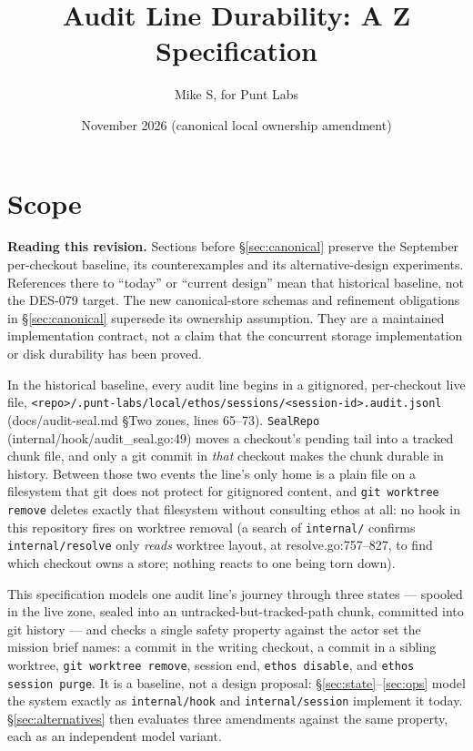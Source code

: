 \documentclass[a4paper,10pt,fleqn]{article}
\newcommand{\fpath}[1]{\nolinkurl{#1}}
\newcommand{\field}[1]{\ifmmode\texttt{#1}\else\texorpdfstring{\breakfield{#1}}{#1}\fi}
\begin{document}
\title{Audit Line Durability: A Z Specification}
\author{Mike S, for Punt Labs}
\date{November 2026 (canonical local ownership amendment)}
\maketitle
\tableofcontents
\newpage

\section{Scope}
\label{sec:scope}

\textbf{Reading this revision.} Sections before
\S\ref{sec:canonical} preserve the September per-checkout baseline,
its counterexamples and its alternative-design experiments. References
there to ``today'' or ``current design'' mean that historical baseline,
not the DES-079 target. The new canonical-store schemas and refinement
obligations in \S\ref{sec:canonical} supersede its ownership assumption.
They are a maintained implementation contract, not a claim that the
concurrent storage implementation or disk durability has been proved.

In the historical baseline, every audit line begins in a gitignored, per-checkout
live file, \fpath{<repo>/.punt-labs/local/ethos/sessions/<session-id>.audit.jsonl}
(docs/audit-seal.md \S Two zones, lines 65--73). \field{SealRepo}
(internal/hook/audit\_seal.go:49) moves a checkout's pending tail into a
tracked chunk file, and only a git commit in \emph{that} checkout makes the
chunk durable in history. Between those two events the line's only home is a
plain file on a filesystem that git does not protect for gitignored content,
and \fpath{git worktree remove} deletes exactly that filesystem without
consulting ethos at all: no hook in this repository fires on worktree
removal (a search of \fpath{internal/} confirms \fpath{internal/resolve}
only \emph{reads} worktree layout, at resolve.go:757--827, to find which
checkout owns a store; nothing reacts to one being torn down).

This specification models one audit line's journey through three states
--- spooled in the live zone, sealed into an untracked-but-tracked-path
chunk, committed into git history --- and checks a single safety property
against the actor set the mission brief names: a commit in the writing
checkout, a commit in a sibling worktree, \fpath{git worktree remove},
session end, \fpath{ethos disable}, and \fpath{ethos session purge}. It is a
baseline, not a design proposal: \S\ref{sec:state}--\ref{sec:ops} model the
system exactly as \fpath{internal/hook} and \fpath{internal/session}
implement it today. \S\ref{sec:alternatives} then evaluates three amendments
against the same property, each as an independent model variant.
\end{document}

